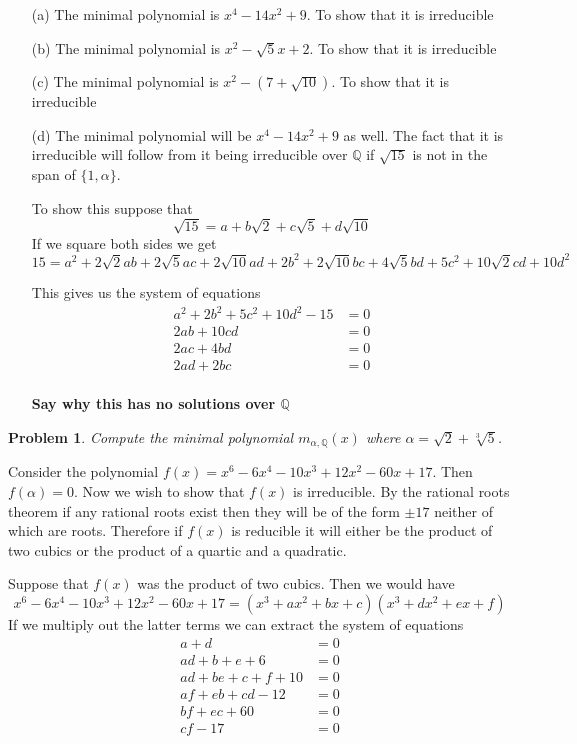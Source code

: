 \documentclass[10pt]{article}
\newcommand{\sk}{\vskip 10mm}
\newcommand{\bb}[1]{\mathbb{#1}}
\theoremstyle{plain}
\newtheorem{problem}{Problem}
\theoremstyle{remark}
\begin{document}
\begin{enumerate}
\item[(a)] The minimal polynomial is $x^4-14x^2+9$. To show that it is irreducible
\item[(b)] The minimal polynomial is $x^2-\sqrt{5}x+2$. To show that it
  is irreducible
\item[(c)] The minimal polynomial is $x^2-(7+\sqrt{10})$. To show that
  it is irreducible
\item[(d)] The minimal polynomial will be $x^4-14x^2+9$ as well. The
  fact that it is irreducible will follow from it being irreducible over
  $\bb{Q}$ if $\sqrt{15}$ is not in the span of $\{1,\alpha\}$.

  To show this suppose that 
  \[ \sqrt{15} = a +b\sqrt{2}+c\sqrt{5}+d\sqrt{10} \]
  If we square both sides we get
  \[15 = a^2 + 2\sqrt{2} a b + 2\sqrt{5} a c + 2\sqrt{10} a d
    + 2 b^2 + 2\sqrt{10} b c + 4\sqrt{5} b d + 5 c^2 + 10\sqrt{2} c d + 10 d^2 \]

  This gives us the system of equations
  \begin{align*}
    a^2+2b^2+5c^2+10d^2-15 &= 0\\
    2ab+10cd &= 0\\
    2ac+4bd &= 0\\
    2ad+2bc &= 0\\
  \end{align*}

  \textbf{Say why this has no solutions over $\bb{Q}$}
\end{enumerate}

\sk

\begin{problem}
  Compute the minimal polynomial $m_{\alpha, \mathbb{Q}}(x)$
  where $\alpha = \sqrt{2} + \sqrt[3]{5}$.
\end{problem}

Consider the polynomial $f(x)=x^{6} - 6 x^{4} - 10 x^{3} + 12 x^{2} - 60 x + 17$. Then $f(\alpha)=0$.
Now we wish to show that $f(x)$ is irreducible. By the rational roots theorem
if any rational roots exist then they will be of the form $\pm 17$ neither of which are
roots. Therefore if $f(x)$ is reducible it will either be the product of two cubics or
the product of a quartic and a quadratic.

Suppose that $f(x)$ was the product of two cubics. Then we would have
\[ x^{6} - 6 x^{4} - 10 x^{3} + 12 x^{2} - 60 x + 17 = (x^3+ax^2+bx+c)(x^3+dx^2+ex+f) \]
If we multiply out the latter terms we can extract the system of equations
\begin{align*}
  a+d &=0\\
  ad+b+e +6 &= 0\\
  ad+be+c+f+10&= 0\\
  af+eb+cd-12&= 0\\
  bf+ec+60&= 0\\
  cf - 17 &= 0\\
\end{align*}
\end{document}

